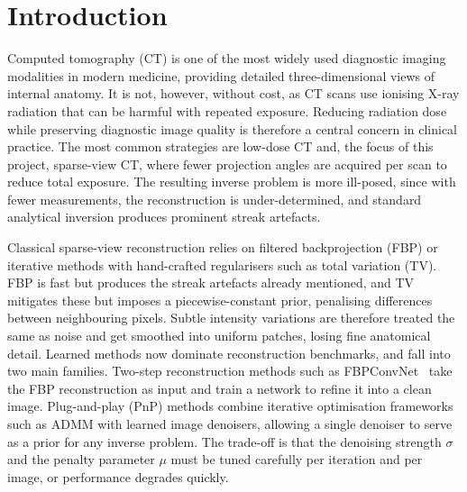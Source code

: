 \chapter{Introduction}
\label{chap:introduction}

Computed tomography (CT) is one of the most widely used diagnostic imaging modalities in modern medicine, providing detailed three-dimensional views of internal anatomy. It is not, however, without cost, as CT scans use ionising X-ray radiation that can be harmful with repeated exposure. Reducing radiation dose while preserving diagnostic image quality is therefore a central concern in clinical practice. The most common strategies are low-dose CT and, the focus of this project, sparse-view CT, where fewer projection angles are acquired per scan to reduce total exposure. The resulting inverse problem is more ill-posed, since with fewer measurements, the reconstruction is under-determined, and standard analytical inversion produces prominent streak artefacts.

Classical sparse-view reconstruction relies on filtered backprojection (FBP) or iterative methods with hand-crafted regularisers such as total variation (TV). FBP is fast but produces the streak artefacts already mentioned, and TV mitigates these but imposes a piecewise-constant prior, penalising differences between neighbouring pixels. Subtle intensity variations are therefore treated the same as noise and get smoothed into uniform patches, losing fine anatomical detail. Learned methods now dominate reconstruction benchmarks, and
fall into two main families. Two-step reconstruction methods such as FBPConvNet~\citep{Jin2017FBPConvNet, Biguri2025LowDose} take the FBP reconstruction as input and train a network to refine it into a clean image. Plug-and-play (PnP) methods combine iterative optimisation frameworks such as ADMM with learned image denoisers, allowing a single denoiser to serve as a prior for any inverse problem. The trade-off is that the denoising strength $\sigma$ and the penalty parameter $\mu$ must be tuned carefully per iteration and per image, or performance degrades quickly.

